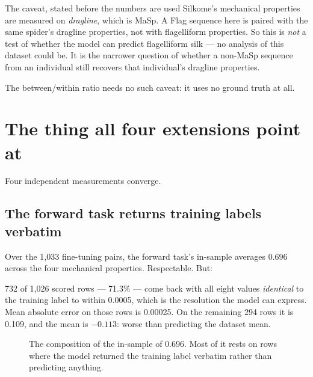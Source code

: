 \begin{warnbox}{The caveat, stated before the numbers are used}
Silkome's mechanical properties are measured on \emph{dragline}, which is MaSp.
A Flag sequence here is paired with the same spider's dragline properties, not
with flagelliform properties. So this is \emph{not} a test of whether the model
can predict flagelliform silk --- no analysis of this dataset could be. It is
the narrower question of whether a non-MaSp sequence from an individual still
recovers that individual's dragline properties.

The between/within ratio needs no such caveat: it uses no ground truth at all.
\end{warnbox}

\section{The thing all four extensions point at}
\label{sec:memorisation}

Four independent measurements converge.

\subsection{The forward task returns training labels verbatim}

Over the 1{,}033 fine-tuning pairs, the forward task's in-sample \Rsq{} averages
0.696 across the four mechanical properties. Respectable. But:

\begin{goodbox}{732 of 1{,}026 scored rows --- 71.3\% --- come back with all eight
values \emph{identical} to the training label}
to within 0.0005, which is the resolution the model can express. Mean absolute
error on those rows is 0.00025. On the remaining 294 rows it is 0.109, and the
mean \Rsq{} is $\mathbf{-0.113}$: worse than predicting the dataset mean.
\end{goodbox}

\begin{figure}[htbp]
\centering
{}
\caption[Memorisation]{The composition of the in-sample \Rsq{} of 0.696. Most
of it rests on rows where the model returned the training label verbatim rather
than predicting anything.}
\label{fig:memorisation}
\end{figure}

